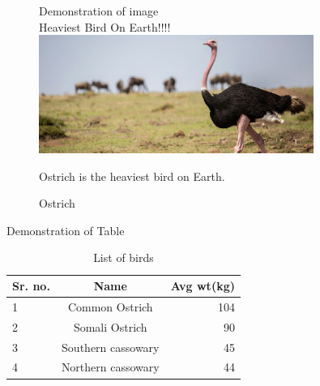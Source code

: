 \documentclass{article}
\begin{document}
\begin{figure}


Demonstration of image\\


Heaviest Bird On Earth!!!!\\

\centering
\includegraphics[width=0.8\textwidth]{ostrichh.jpg}
\caption{Ostrich}
\label{Fig:1}


Ostrich is the heaviest bird on Earth.\\


\end{figure}

Demonstration of Table\\
\begin{table}[h!]
		\begin{center}
			\caption{List of birds}
			\label{tab:table1}
			\begin{tabular}{l|c|r} %
				
				\textbf{Sr. no.} & \textbf{Name} & \textbf{Avg wt(kg)}\\
				
				\hline
				1 &Common Ostrich &104\\
				2 &Somali Ostrich &90\\
				3 &Southern cassowary &45\\
				4 &Northern cassowary &44\\ %
			\end{tabular}
		\end{center}
	\end{table}
\end{document}
